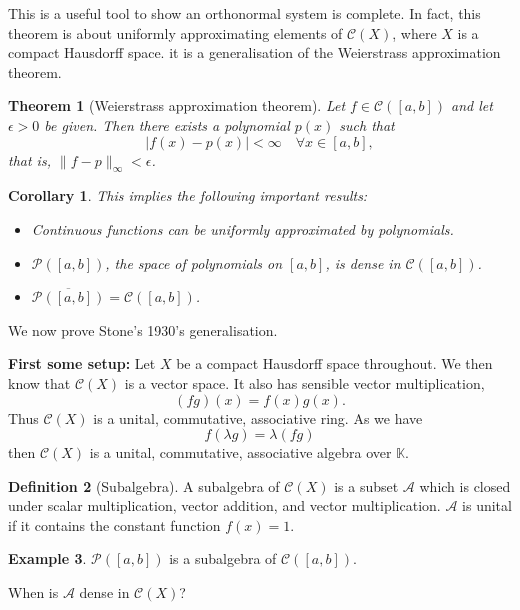 \documentclass[10pt, oneside, reqno]{amsbook}
\theoremstyle{plain}%
\newtheorem{thm}{Theorem}[section]
\newtheorem*{cor}{Corollary}
\theoremstyle{definition}
\newtheorem{defn}[thm]{Definition}
\newtheorem{exmp}[thm]{Example}
\theoremstyle{remark}
\newcommand{\K}{\mathbb{K}}
\begin{document}
This is a useful tool to show an orthonormal system is complete.  In fact, this theorem is about uniformly approximating elements of $\mathcal{C}(X)$, where $X$ is a compact Hausdorff space.  it is a generalisation of the Weierstrass approximation theorem.

\begin{thm}[Weierstrass approximation theorem]
    Let $f \in \mathcal{C}([a,b])$ and let $\epsilon > 0$ be given.  Then there exists a polynomial $p(x)$ such that \[
        |f(x) - p(x) | < \infty \quad \forall x \in [a,b],
    \] that is, $\| f - p \|_\infty < \epsilon$.
    
    
\end{thm}
\begin{cor}  This implies the following important results:
    \begin{itemize}
        \item Continuous functions can be uniformly approximated by polynomials.  
        \item $\mathcal{P}([a,b])$, the space of polynomials on $[a,b]$, is dense in $\mathcal{C}([a,b])$.
        \item $\overline{\mathcal{P}([a,b])} = \mathcal{C}([a,b])$.   
    \end{itemize}
\end{cor}

We now prove Stone's 1930's generalisation.

\textbf{First some setup:} Let $X$ be a compact Hausdorff space throughout.  We then know that $\mathcal{C}(X)$ is a vector space.  It also has sensible vector multiplication, \[
    (fg)(x) = f(x) g(x).
\] Thus $\mathcal{C}(X)$ is a unital, commutative, associative ring.  As we have \[
    f(\lambda g) = \lambda (fg)
\] then $\mathcal{C}(X)$ is a unital, commutative, associative algebra over $\K$.  

\begin{defn}[Subalgebra] A subalgebra of $\mathcal{C}(X)$ is a subset $\mathcal{A}$ which is closed under scalar multiplication, vector addition, and vector multiplication.  $\mathcal{A}$ is unital if it contains the constant function $f(x) = 1$.  
\end{defn}

\begin{exmp}
    $\mathcal{P}([a,b])$ is a subalgebra of $\mathcal{C}([a,b])$.  
\end{exmp}

When is $\mathcal{A}$ dense in $\mathcal{C}(X)$?
\end{document}

